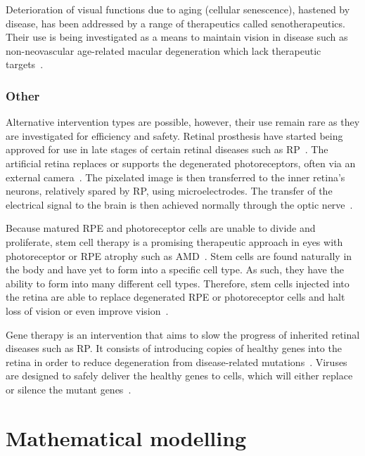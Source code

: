 \documentclass{article}
\begin{document}
Deterioration of visual functions due to aging (cellular senescence), hastened by disease, has been addressed by a range of therapeutics called senotherapeutics.
Their use is being investigated as a means to maintain vision in disease such as non-neovascular age-related macular degeneration which lack therapeutic targets~\cite{Lee_2021}.


\subsubsection{Other}

Alternative intervention types are possible, however, their use remain rare as they are investigated for efficiency and safety.
Retinal prosthesis have started being approved for use in late stages of certain retinal diseases such as RP~\cite{Luo_2016}.
The artificial retina replaces or supports the degenerated photoreceptors, often via an external camera~\cite{Luo_2016,Stingl_2017}.
The pixelated image is then transferred to the inner retina's neurons, relatively spared by RP, using microelectrodes.
The transfer of the electrical signal to the brain is then achieved normally through the optic nerve~\cite{Luo_2016,Stingl_2017}.

Because matured RPE and photoreceptor cells are unable to divide and proliferate, stem cell therapy is a promising therapeutic approach in eyes with photoreceptor or RPE atrophy such as AMD~\cite{Berta_2011,Stern_2015}.
Stem cells are found naturally in the body and have yet to form into a specific cell type.
As such, they have the ability to form into many different cell types.
Therefore, stem cells injected into the retina are able to replace degenerated RPE or photoreceptor cells and halt loss of vision or even improve vision~\cite{ONeill_2020}.

Gene therapy is an intervention that aims to slow the progress of inherited retinal diseases such as RP.
It consists of introducing copies of healthy genes into the retina in order to reduce degeneration from disease-related mutations~\cite{Battu_2022}.
Viruses are designed to safely deliver the healthy genes to cells, which will either replace or silence the mutant genes~\cite{Battu_2022}.








\section{Mathematical modelling}\label{sec:MathematicalPrimer}
\end{document}
